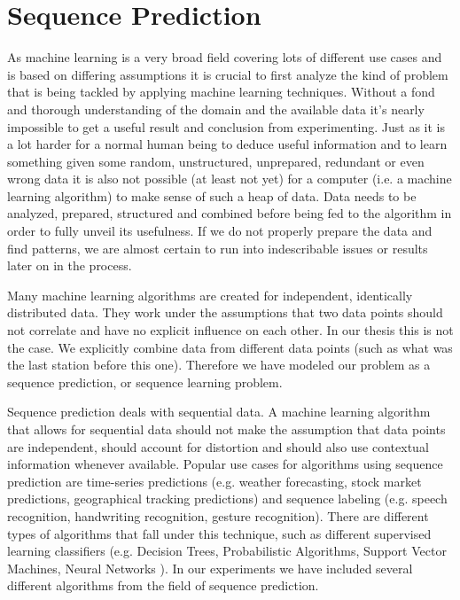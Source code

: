 \section{Sequence Prediction}
As machine learning is a very broad field covering lots of different use cases and is based on differing assumptions it is crucial to first analyze the kind of problem that is being tackled by applying machine learning techniques. Without a fond and thorough understanding of the domain and the available data it's nearly impossible to get a useful result and conclusion from experimenting. Just as it is a lot harder for a normal human being to deduce useful information and to learn something given some random, unstructured, unprepared, redundant or even wrong data it is also not possible (at least not yet) for a computer (i.e. a machine learning algorithm) to make sense of such a heap of data. Data needs to be analyzed, prepared, structured and combined before being fed to the algorithm in order to fully unveil its usefulness. If we do not properly prepare the data and find patterns, we are almost certain to run into indescribable issues or results later on in the process. \cite{DataMining} 

Many machine learning algorithms are created for independent, identically distributed data. \cite{MachineLearningTUMunich} They work under the assumptions that two data points should not correlate and have no explicit influence on each other. In our thesis this is not the case. We explicitly combine data from different data points (such as what was the last station before this one). Therefore we have modeled our problem as a sequence prediction, or sequence learning problem.

Sequence prediction deals with sequential data. A machine learning algorithm that allows for sequential data should not make the assumption that data points are independent, should account for distortion and should also use contextual information whenever available. Popular use cases for algorithms using sequence prediction are time-series predictions (e.g. weather forecasting, stock market predictions, geographical tracking predictions) and sequence labeling (e.g. speech recognition, handwriting recognition, gesture recognition). There are different types of algorithms that fall under this technique, such as different supervised learning classifiers (e.g. Decision Trees, Probabilistic Algorithms, Support Vector Machines, Neural Networks \cite{WikipediaSupervisedLearning}). In our experiments we have included several different algorithms from the field of sequence prediction.

